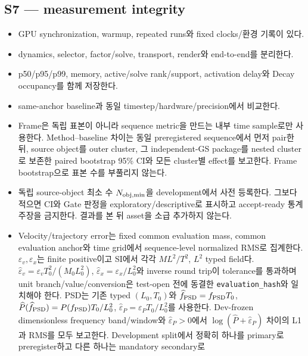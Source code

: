 \documentclass[10pt]{article}
\newcommand{\code}[1]{{\small\nolinkurl{#1}}}
\begin{document}
\subsection{S7 --- measurement integrity}

\begin{itemize}
  \item [\(\square\)] GPU synchronization, warmup, repeated runs와 fixed clocks/환경 기록이 있다.
  \item [\(\square\)] dynamics, selector, factor/solve, transport, render와 end-to-end를 분리한다.
  \item [\(\square\)] p50/p95/p99, memory, active/solve rank/support, activation delay와
  Decay occupancy를 함께 저장한다.
  \item [\(\square\)] same-anchor baseline과 동일 timestep/hardware/precision에서 비교한다.
  \item [\(\square\)] Frame은 독립 표본이 아니라 sequence metric을 만드는 내부 time sample로만
  사용한다. Method--baseline 차이는 동일 preregistered sequence에서 먼저 pair한 뒤,
  source object를 outer cluster, 그 independent-GS package를 nested cluster로 보존한
  paired bootstrap 95\% CI와
  모든 cluster별 effect를 보고한다. Frame bootstrap으로 표본 수를 부풀리지 않는다.
  \item [\(\square\)] 독립 source-object 최소 수 \(N_{\rm obj,min}\)을 development에서 사전 등록한다.
  그보다 적으면 CI와 Gate 판정을 exploratory/descriptive로 표시하고 accept-ready 통계 주장을 금지한다.
  결과를 본 뒤 asset을 소급 추가하지 않는다.
  \item [\(\square\)] Velocity/trajectory error는 fixed common evaluation mass,
  common evaluation anchor와 time grid에서
  sequence-level normalized RMS로 집계한다. \(\varepsilon_v,\varepsilon_x\)는 finite positive이고
  SI에서 각각 \(ML^2/T^2\), \(L^2\) typed field다.
  \(\widehat\varepsilon_v=\varepsilon_vT_0^2/(M_0L_0^2)\),
  \(\widehat\varepsilon_x=\varepsilon_x/L_0^2\)와 inverse round trip이 tolerance를 통과하며
  unit branch/value/conversion은 test-open 전에 동결한 \code{evaluation\_hash}와 일치해야 한다.
  PSD는 기존 typed \((L_0,T_0)\)와
  \(\widehat f_{\rm PSD}=f_{\rm PSD}T_0\),
  \(\widehat P(\widehat f_{\rm PSD})=P(f_{\rm PSD})T_0/L_0^2\),
  \(\widehat\varepsilon_P=\varepsilon_PT_0/L_0^2\)를 사용한다.
  Dev-frozen dimensionless frequency band/window와 \(\widehat\varepsilon_P>0\)에서
  \(\log(\widehat P+\widehat\varepsilon_P)\) 차이의 L1과 RMS를 모두 보고한다.
  Development split에서 정확히 하나를 primary로 preregister하고 다른 하나는 mandatory secondary로

\end{itemize}
\end{document}
